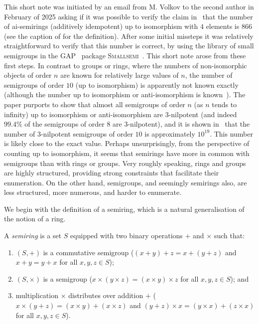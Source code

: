 \documentclass{article}
\newcommand{\cref}[1]{\zcref[S]{#1}}
\theoremstyle{plain}
\theoremstyle{definition}
\newcommand{\GAP}{\textsc{GAP}~\cite{GAP4}\xspace}
\newcommand{\Smallsemi}{\textsc{Smallsemi}~\cite{Smallsemi}\xspace}
\begin{document}
This short note was initiated by an email from M. Volkov to the second author
in February of 2025 asking if it was possible to verify the claim
in~\cite{Ren2025} that the number of ai-semirings (additively
idempotent) up to isomorphism with $4$
elements is $866$ (see the caption of \cref{tab:ai-semirings} for the
definition). After some initial missteps it was relatively
straightforward to verify that this number is correct, by using the library of
small semigroups in the \GAP package \Smallsemi. This short note arose from
these first steps. In contrast to groups or rings, where the numbers of
non-isomorphic objects of order $n$ are known for relatively large values of
$n$, the number of semigroups of order $10$ (up to isomorphism) is apparently
not known exactly (although the number up to isomorphism or anti-isomorphism
is known~\cite{Distler2012}). The paper \cite{Kleitman1976} purports to show
that almost all semigroups of order $n$ (as $n$ tends to infinity) up to
isomorphism or anti-isomorphism are $3$-nilpotent (and indeed $99.4\%$ of the
semigroups of order $8$ are $3$-nilpotent), and it is shown
in~\cite{Distler2012ab} that the number of $3$-nilpotent semigroups of order
$10$ is approximately $10 ^ {19}$. This number is likely close to the exact
value. Perhaps unsurprisingly, from the perspective of counting up to
isomorphism, it seems that semirings have more in common with semigroups than
with rings or groups. Very roughly speaking, rings and groups are highly
structured, providing strong constraints that facilitate their enumeration. On
the other hand, semigroups, and seemingly semirings also, are less structured,
more numerous, and harder to enumerate.

We begin with the definition of a semiring, which is a natural generalisation
of the notion of a ring.

\begin{defn}[Semiring]
  \label{def:semiring}
  A \emph{semiring} is a set \(S\) equipped with two binary
  operations \(+\) and  \(\times\) such that:
  \begin{enumerate}
    \item \((S, +)\) is a commutative semigroup ($(x + y) + z = x + (y + z)$
      and $x + y = y + x$ for all $x, y, z\in S$);
    \item \((S, \times)\) is a semigroup ($x\times (y \times z) = (x\times
      y)\times z$ for all $x,y, z\in S$); and
    \item multiplication $\times$ distributes over addition $+$
      ($x \times (y + z) = (x \times y) + (x \times z)$ and
      $(y + z) \times x = (y \times x) + (z \times x)$ for all $x, y, z \in S$).
  \end{enumerate}
\end{defn}
\end{document}
